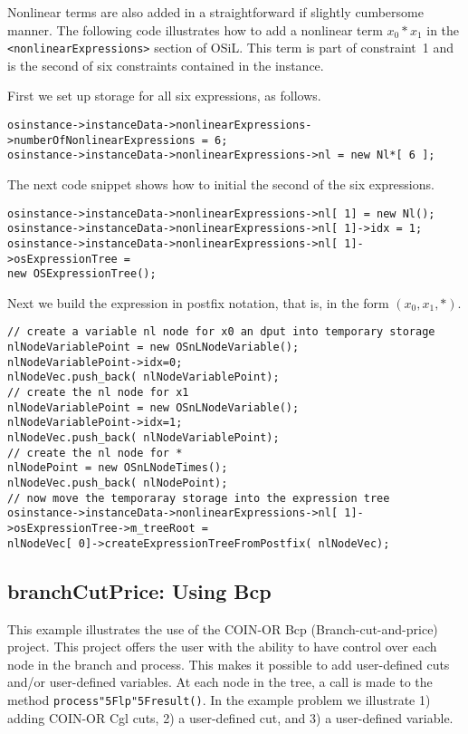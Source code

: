\documentclass[11pt]{article}
\renewcommand{\_}{{\char"5F}}
\renewcommand{\{}{{\char"7B}}
\renewcommand{\}}{{\char"7D}}
\renewcommand{\^}{{\char"0D}}
\renewcommand{\'}{{\char"0D}}
\begin{document}
Nonlinear terms are also added in a straightforward if slightly cumbersome manner.   
The following code illustrates how to add a nonlinear term $x_{0}*x_{1}$ in the 
{\tt <nonlinearExpressions>} section of  OSiL. This term is part of constraint~1
and is the second of six constraints contained in the instance. 

First we set up storage for all six expressions, as follows.

\begin{verbatim}
osinstance->instanceData->nonlinearExpressions->numberOfNonlinearExpressions = 6;
osinstance->instanceData->nonlinearExpressions->nl = new Nl*[ 6 ];
\end{verbatim}

The next code snippet shows how to initial the second of the six expressions.

\begin{verbatim}
osinstance->instanceData->nonlinearExpressions->nl[ 1] = new Nl();
osinstance->instanceData->nonlinearExpressions->nl[ 1]->idx = 1;
osinstance->instanceData->nonlinearExpressions->nl[ 1]->osExpressionTree =
new OSExpressionTree();
\end{verbatim}

Next we build the expression in postfix notation, that is, in the form $(x_0, x_1, *)$.

\begin{verbatim}
// create a variable nl node for x0 an dput into temporary storage
nlNodeVariablePoint = new OSnLNodeVariable();
nlNodeVariablePoint->idx=0;
nlNodeVec.push_back( nlNodeVariablePoint);
// create the nl node for x1
nlNodeVariablePoint = new OSnLNodeVariable();
nlNodeVariablePoint->idx=1;
nlNodeVec.push_back( nlNodeVariablePoint);
// create the nl node for *
nlNodePoint = new OSnLNodeTimes();
nlNodeVec.push_back( nlNodePoint);
// now move the temporaray storage into the expression tree
osinstance->instanceData->nonlinearExpressions->nl[ 1]->osExpressionTree->m_treeRoot =
nlNodeVec[ 0]->createExpressionTreeFromPostfix( nlNodeVec);
\end{verbatim}





\subsection{branchCutPrice:  Using Bcp}\label{section:examplebranchCutPrice}

This example illustrates the use of the COIN-OR Bcp (Branch-cut-and-price) project.  This project offers the user with the ability to have control over each node in the branch and process. This makes it possible to add user-defined cuts and/or user-defined variables. At each node in the tree, a call is made to the method {\tt process\_lp\_result()}. In the example problem we illustrate 1) adding COIN-OR Cgl cuts, 2) a user-defined cut, and 3) a user-defined variable. 
\end{document}
